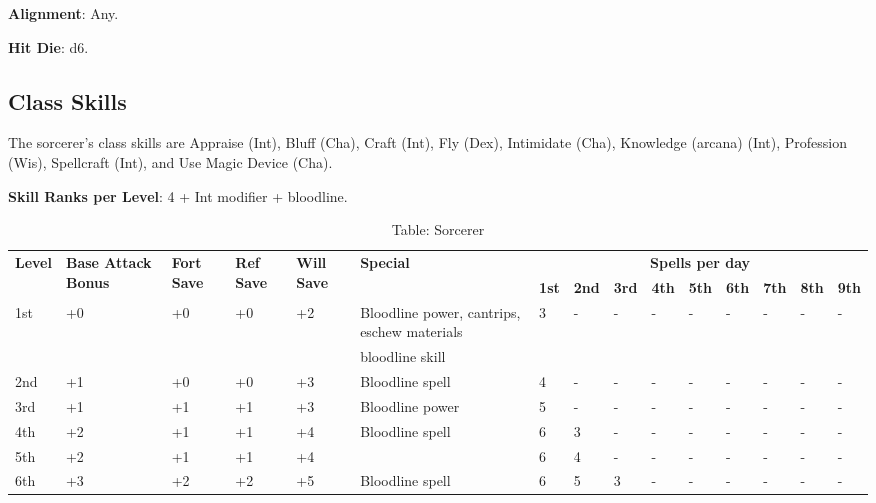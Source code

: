 \textbf{Alignment}: Any.
				
\textbf{Hit Die}: d6.
				
\subsection{Class Skills}

				
The sorcerer's class skills are Appraise (Int), Bluff (Cha), Craft (Int), Fly (Dex), Intimidate (Cha), Knowledge (arcana) (Int), Profession (Wis), Spellcraft (Int), and Use Magic Device (Cha).
				
\textbf{Skill Ranks per Level}: 4 + Int modifier + bloodline.

\begin{table*}[]
\caption{Table: Sorcerer}
\sffamily
\setlength{\tabcolsep}{1pt}
\begin{tabularx}{\linewidth}{lp{6em}p{2.5em}p{2.5em}p{2.5em}Xlllllllll}
\multirow{2}{*}{\textbf{Level}} & \multirow{2}{*}{\parbox{5em}{\textbf{Base Attack Bonus}}} & \multirow{2}{*}{\parbox{1.5em}{\textbf{Fort Save}}} & \multirow{2}{*}{\parbox{1.5em}{\textbf{Ref Save}}} & \multirow{2}{*}{\parbox{1.5em}{\textbf{Will Save}}} & \textbf{Special}      & \multicolumn{9}{c}{\textbf{Spells per day}} \\
                       &                                    &                            &                           &                            &                                                                                                  & \textbf{1st} & \textbf{2nd} & \textbf{3rd} & \textbf{4th} & \textbf{5th} & \textbf{6th} & \textbf{7th} & \textbf{8th} & \textbf{9th} \\
1st & +0 & +0 & +0 & +2 & Bloodline power, cantrips, eschew materials & 3 & - & - & - & - & - & - & - & -\\
    &    &    &    &    & bloodline skill                             &   &   &   &   &   &   &   &   &  \\
2nd & +1 & +0 & +0 & +3 & Bloodline spell & 4 & - & - & - & - & - & - & - & -\\
3rd & +1 & +1 & +1 & +3 & Bloodline power & 5 & - & - & - & - & - & - & - & -\\
4th & +2 & +1 & +1 & +4 & Bloodline spell & 6 & 3 & - & - & - & - & - & - & -\\
5th & +2 & +1 & +1 & +4 &  & 6 & 4 & - & - & - & - & - & - & -\\
6th & +3 & +2 & +2 & +5 & Bloodline spell & 6 & 5 & 3 & - & - & - & - & - & -\\

\end{tabularx}
\end{table*}
